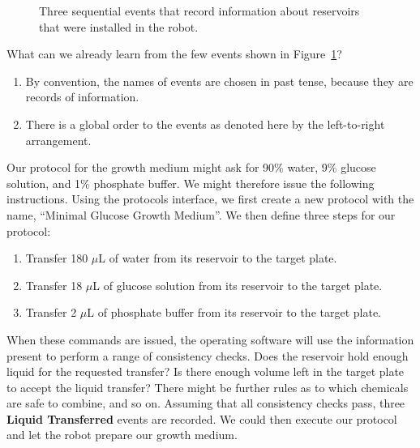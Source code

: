 \documentclass[
  a4paper,
]{scrartcl}
\makeatletter
\newcommand*\pandocbounded[1]{%
  \sbox\pandoc@box{#1}%
  \Gscale@div\@tempa{\textheight}{\dimexpr\ht\pandoc@box+\dp\pandoc@box\relax}%
  \Gscale@div\@tempb{\linewidth}{\wd\pandoc@box}%
  \ifdim\@tempb\p@<\@tempa\p@\let\@tempa\@tempb\fi%
  \ifdim\@tempa\p@<\p@\scalebox{\@tempa}{\usebox\pandoc@box}%
  \else\usebox{\pandoc@box}%
  \fi%
}
\providecommand{\tightlist}{%
  \setlength{\itemsep}{0pt}\setlength{\parskip}{0pt}}
\makeatother
\begin{document}
\begin{figure}

\centering{

\pandocbounded{\texttt{[image: reservoirs\_installed.png]}}

}

\caption{\label{fig-reservoirs-installed}Three sequential events that
record information about reservoirs that were installed in the robot.}

\end{figure}%

What can we already learn from the few events shown in
Figure~\ref{fig-reservoirs-installed}?

\begin{enumerate}
\def\labelenumi{\arabic{enumi}.}
\tightlist
\item
  By convention, the names of events are chosen in past tense, because
  they are records of information.
\item
  There is a global order to the events as denoted here by the
  left-to-right arrangement.
\end{enumerate}

Our protocol for the growth medium might ask for 90\% water, 9\% glucose
solution, and 1\% phosphate buffer. We might therefore issue the
following instructions. Using the protocols interface, we first create a
new protocol with the name, ``Minimal Glucose Growth Medium''. We then
define three steps for our protocol:

\begin{enumerate}
\def\labelenumi{\arabic{enumi}.}
\tightlist
\item
  Transfer 180 \(\mu\)L of water from its reservoir to the target plate.
\item
  Transfer 18 \(\mu\)L of glucose solution from its reservoir to the
  target plate.
\item
  Transfer 2 \(\mu\)L of phosphate buffer from its reservoir to the
  target plate.
\end{enumerate}

When these commands are issued, the operating software will use the
information present to perform a range of consistency checks. Does the
reservoir hold enough liquid for the requested transfer? Is there enough
volume left in the target plate to accept the liquid transfer? There
might be further rules as to which chemicals are safe to combine, and so
on. Assuming that all consistency checks pass, three \textbf{Liquid
Transferred} events are recorded. We could then execute our protocol and
let the robot prepare our growth medium.
\end{document}
